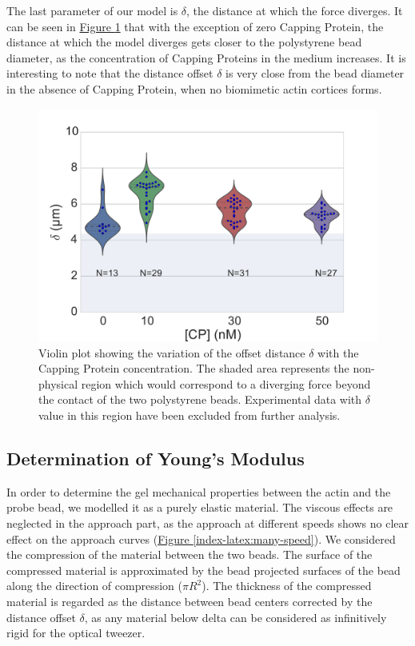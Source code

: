 \documentclass[A4paperpaper,11pt,english]{sphinxmanual}
\begin{document}
The last parameter of our model is \(\delta\), the distance at which the force
diverges.   It can be seen in \hyperref[index-latex:delta-violin]{Figure  \ref*{index-latex:delta-violin}} that with the exception
of zero Capping Protein, the distance at which the model diverges gets
closer to the polystyrene bead diameter, as the concentration of Capping
Proteins in the medium increases. It is interesting to note that the distance offset
\(\delta\) is very close from the bead diameter in the absence of Capping Protein, when no
biomimetic actin cortices forms.
\begin{figure}[htbp]
\centering
\capstart

\includegraphics[width=0.800\linewidth]{delta_violin.pdf}
\caption{Violin plot showing the variation of the offset distance \(\delta\)
with the Capping Protein concentration. The shaded area represents the
non-physical region which would correspond to a diverging force beyond the
contact of the two polystyrene beads. Experimental data with \(\delta\)
value in this region have been excluded from further analysis.}\label{index-latex:delta-violin}\end{figure}


\subsection{Determination of Young's Modulus}
\label{index-latex:determination-of-young-s-modulus}
In order to determine the gel mechanical properties between the actin and the
probe bead, we modelled it as a purely elastic material. The viscous effects are
neglected in the approach part, as the approach at different speeds shows no
clear effect on the approach curves (\hyperref[index-latex:many-speed]{Figure  \ref*{index-latex:many-speed}}). We considered
the compression of the material between the two beads. The surface of the
compressed material is approximated by the bead projected surfaces of the bead along the
direction of compression (\(\pi R^2\)).  The thickness of the compressed
material is regarded as the distance between bead centers corrected by the
distance offset \(\delta\), as any material below delta can be considered as
infinitively rigid for the optical tweezer.
\end{document}
